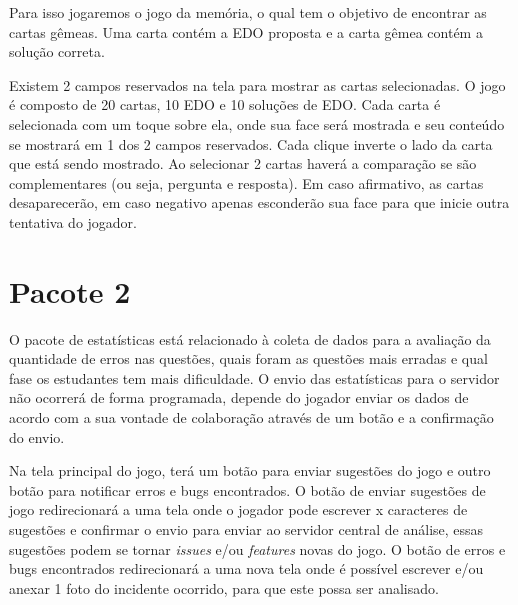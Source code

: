 Para isso jogaremos o jogo da memória, o qual tem o objetivo de encontrar as cartas gêmeas. Uma carta contém a EDO proposta e a carta gêmea contém a solução correta.

Existem 2 campos reservados na tela para mostrar as cartas selecionadas. O jogo é composto de 20 cartas, 10 EDO e 10 soluções de EDO. Cada carta é selecionada com um toque sobre ela, onde sua face será mostrada e seu conteúdo se mostrará em 1 dos 2 campos reservados. Cada clique inverte o lado da carta que está sendo mostrado. Ao selecionar 2 cartas haverá a comparação se são complementares (ou seja, pergunta e resposta). Em caso afirmativo, as cartas desaparecerão, em caso negativo apenas esconderão sua face para que inicie outra tentativa do jogador.

\section[Pacote 2]{Pacote 2}
O pacote de estatísticas está relacionado à coleta de dados para a avaliação da quantidade de erros nas questões, quais foram as questões mais erradas e qual fase os estudantes tem mais dificuldade. O envio das estatísticas para o servidor não ocorrerá de forma programada, depende do jogador enviar os dados de acordo com a sua vontade de colaboração através de um botão e a confirmação do envio.


Na tela principal do jogo, terá um botão para enviar sugestões do jogo e outro botão para notificar erros e bugs encontrados.
O botão de enviar sugestões de jogo redirecionará a uma tela onde o jogador pode escrever x caracteres de sugestões e confirmar o envio para enviar ao servidor central de análise, essas sugestões podem se tornar \textit{issues} e/ou \textit{features} novas do jogo.
O botão de erros e bugs encontrados redirecionará a uma nova tela onde é possível escrever e/ou anexar 1 foto do incidente ocorrido, para que este possa ser analisado.


